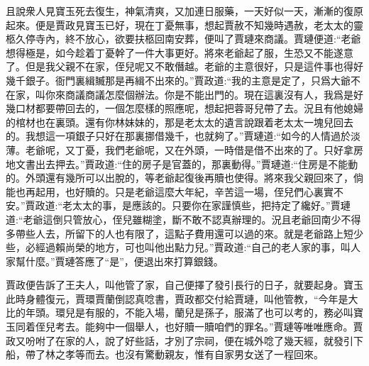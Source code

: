 \begin{parag}
    且說衆人見寶玉死去復生，神氣清爽，又加連日服藥，一天好似一天，漸漸的復原起來。便是賈政見寶玉已好，現在丁憂無事，想起賈赦不知幾時遇赦，老太太的靈柩久停寺內，終不放心，欲要扶柩回南安葬，便叫了賈璉來商議。賈璉便道:“老爺想得極是，如今趁着丁憂幹了一件大事更好。將來老爺起了服，生恐又不能遂意了。但是我父親不在家，侄兒呢又不敢僭越。老爺的主意很好，只是這件事也得好幾千銀子。衙門裏緝贓那是再緝不出來的。”賈政道:“我的主意是定了，只爲大爺不在家，叫你來商議商議怎麼個辦法。你是不能出門的。現在這裏沒有人，我爲是好幾口材都要帶回去的，一個怎麼樣的照應呢，想起把蓉哥兒帶了去。況且有他媳婦的棺材也在裏頭。還有你林妹妹的，那是老太太的遺言說跟着老太太一塊兒回去的。我想這一項銀子只好在那裏挪借幾千，也就夠了。”賈璉道:“如今的人情過於淡薄。老爺呢，又丁憂，我們老爺呢，又在外頭，一時借是借不出來的了。只好拿房地文書出去押去。”賈政道:“住的房子是官蓋的，那裏動得。”賈璉道:“住房是不能動的。外頭還有幾所可以出脫的，等老爺起復後再贖也使得。將來我父親回來了，倘能也再起用，也好贖的。只是老爺這麼大年紀，辛苦這一場，侄兒們心裏實不安。”賈政道:“老太太的事，是應該的。只要你在家謹慎些，把持定了纔好。”賈璉道:“老爺這倒只管放心，侄兒雖糊塗，斷不敢不認真辦理的。況且老爺回南少不得多帶些人去，所留下的人也有限了，這點子費用還可以過的來。就是老爺路上短少些，必經過賴尚榮的地方，可也叫他出點力兒。”賈政道:“自己的老人家的事，叫人家幫什麼。”賈璉答應了“是”，便退出來打算銀錢。
\end{parag}


\begin{parag}
    賈政便告訴了王夫人，叫他管了家，自己便擇了發引長行的日子，就要起身。寶玉此時身體復元，賈環賈蘭倒認真唸書，賈政都交付給賈璉，叫他管教，“今年是大比的年頭。環兒是有服的，不能入場，蘭兒是孫子，服滿了也可以考的，務必叫寶玉同着侄兒考去。能夠中一個舉人，也好贖一贖咱們的罪名。”賈璉等唯唯應命。賈政又吩咐了在家的人，說了好些話，才別了宗祠，便在城外唸了幾天經，就發引下船，帶了林之孝等而去。也沒有驚動親友，惟有自家男女送了一程回來。
\end{parag}


